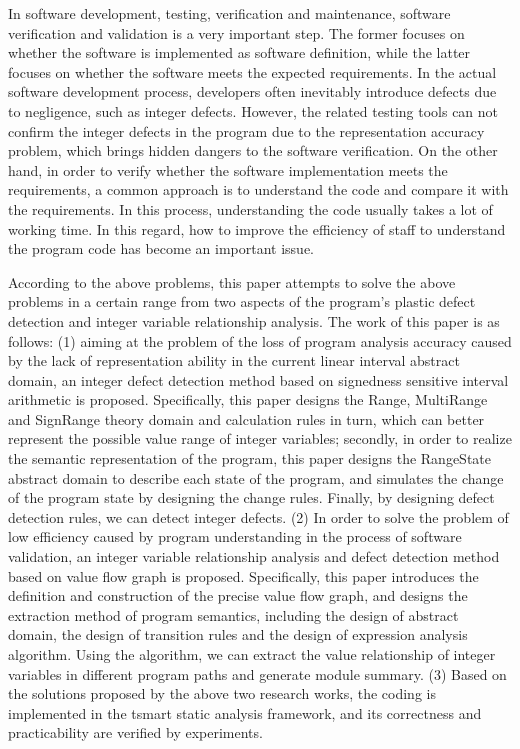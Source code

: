 \begin{abstract*}
	
In software development, testing, verification and maintenance, software verification and validation is a very important step. The former focuses on whether the software is implemented as software definition, while the latter focuses on whether the software meets the expected requirements. In the actual software development process, developers often inevitably introduce defects due to negligence, such as integer defects. However, the related testing tools can not confirm the integer defects in the program due to the representation accuracy problem, which brings hidden dangers to the software verification. On the other hand, in order to verify whether the software implementation meets the requirements, a common approach is to understand the code and compare it with the requirements. In this process, understanding the code usually takes a lot of working time. In this regard, how to improve the efficiency of staff to understand the program code has become an important issue.

According to the above problems, this paper attempts to solve the above problems in a certain range from two aspects of the program's plastic defect detection and integer variable relationship analysis. The work of this paper is as follows: (1) aiming at the problem of the loss of program analysis accuracy caused by the lack of representation ability in the current linear interval abstract domain, an integer defect detection method based on signedness sensitive interval arithmetic is proposed. Specifically, this paper designs the Range, MultiRange and SignRange theory domain and calculation rules in turn, which can better represent the possible value range of integer variables; secondly, in order to realize the semantic representation of the program, this paper designs the RangeState abstract domain to describe each state of the program, and simulates the change of the program state by designing the change rules. Finally, by designing defect detection rules, we can detect integer defects. (2) In order to solve the problem of low efficiency caused by program understanding in the process of software validation, an integer variable relationship analysis and defect detection method based on value flow graph is proposed. Specifically, this paper introduces the definition and construction of the precise value flow graph, and designs the extraction method of program semantics, including the design of abstract domain, the design of transition rules and the design of expression analysis algorithm. Using the algorithm, we can extract the value relationship of integer variables in different program paths and generate module summary. (3) Based on the solutions proposed by the above two research works, the coding is implemented in the tsmart static analysis framework, and its correctness and practicability are verified by experiments.


\end{abstract*}

